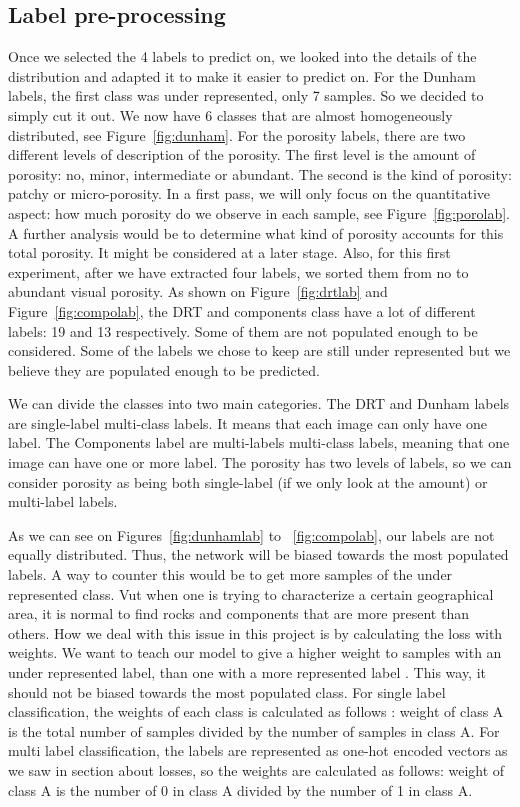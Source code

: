\subsection{Label pre-processing}
Once we selected the 4 labels to predict on, we looked into the details of the distribution and adapted it to make it easier to predict on. For the Dunham labels, the first class was under represented, only 7 samples. So we decided to simply cut it out. We now have 6 classes that are almost homogeneously distributed, see Figure~\ref{fig:dunham}. 
For the porosity labels, there are two different levels of description of the porosity. The first level is the amount of porosity: no, minor, intermediate or abundant. The second is the kind of porosity: patchy or micro-porosity. In a first pass, we will only focus on the quantitative aspect: how much porosity do we observe in each sample, see Figure~\ref{fig:porolab}. A further analysis would be to determine what kind of porosity accounts for this total porosity. It might be considered at a later stage. Also, for this first experiment, after we have extracted four labels, we sorted them from no to abundant visual porosity. 
As shown on Figure~\ref{fig:drtlab} and Figure~\ref{fig:compolab}, the DRT and components class have a lot of different labels: 19 and 13 respectively. Some of them are not populated enough to be considered. Some of the labels we chose to keep are still under represented but we believe they are populated enough to be predicted.

We can divide the classes into two main categories. The DRT and Dunham labels are single-label multi-class labels. It means that each image can only have one label. The Components label are multi-labels multi-class labels, meaning that one image can have one or more label. The porosity has two levels of labels, so we can consider porosity as being both single-label (if we only look at the amount) or multi-label labels. 


As we can see on Figures~\ref{fig:dunhamlab} to ~\ref{fig:compolab}, our labels are not equally distributed. Thus, the network will be biased towards the most populated labels. A way to counter this would be to get more samples of the under represented class. Vut when one is trying to characterize a certain geographical area, it is normal to find rocks and components that are more present than others. How we deal with this issue in this project is by calculating the loss with weights. We want to teach our model to give a higher weight to samples with an under represented label, than one with a more represented label . This way, it should not be biased towards the most populated class. 
For single label classification, the weights of each class is calculated as follows : weight of class A is the total number of samples divided by the number of samples in class A.
For multi label classification, the labels are represented as one-hot encoded vectors as we saw in section about losses, so the weights are calculated as follows: weight of class A is the number of 0 in class A divided by the number of 1 in class A.

